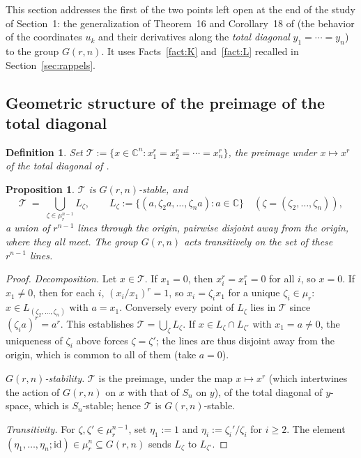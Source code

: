 \documentclass[10pt,a4paper]{amsart}
\newtheorem{proposition}[theorem]{Proposition}
\newtheorem{definition}[theorem]{Definition}
\newcommand{\CC}{\mathbb{C}}
\begin{document}
This section addresses the first of the two points left open at the end of the study of Section~1: the generalization of Theorem~16 and Corollary~18 of \cite{Ze} (the behavior of the coordinates $u_k$ and their derivatives along the \emph{total diagonal} $y_1=\cdots=y_n$) to the group $G(r,n)$. It uses Facts~\ref{fact:K} and~\ref{fact:L} recalled in Section~\ref{sec:rappels}.

\subsection{Geometric structure of the preimage of the total diagonal}

\begin{definition}
Set $\mathcal T := \{x\in\CC^n : x_1^r=x_2^r=\cdots=x_n^r\}$, the preimage under $x\mapsto x^r$ of the total diagonal of \cite{Ze}.
\end{definition}

\begin{proposition}\label{prop:structT}
$\mathcal T$ is $G(r,n)$-stable, and
\[
\mathcal T \;=\; \bigcup_{\zeta\in\mu_r^{n-1}} L_\zeta, \qquad L_\zeta := \{(a,\zeta_2a,\dots,\zeta_na) : a\in\CC\} \quad (\zeta=(\zeta_2,\dots,\zeta_n)),
\]
a union of $r^{n-1}$ lines through the origin, pairwise disjoint away from the origin, where they all meet. The group $G(r,n)$ acts transitively on the set of these $r^{n-1}$ lines.
\end{proposition}

\begin{proof}
\emph{Decomposition.} Let $x\in\mathcal T$. If $x_1=0$, then $x_i^r=x_1^r=0$ for all $i$, so $x=0$. If $x_1\ne0$, then for each $i$, $(x_i/x_1)^r=1$, so $x_i=\zeta_ix_1$ for a unique $\zeta_i\in\mu_r$: $x\in L_{(\zeta_2,\dots,\zeta_n)}$ with $a=x_1$. Conversely every point of $L_\zeta$ lies in $\mathcal T$ since $(\zeta_ia)^r=a^r$. This establishes $\mathcal T=\bigcup_\zeta L_\zeta$. If $x\in L_\zeta\cap L_{\zeta'}$ with $x_1=a\ne0$, the uniqueness of $\zeta_i$ above forces $\zeta=\zeta'$; the lines are thus disjoint away from the origin, which is common to all of them (take $a=0$).

\emph{$G(r,n)$-stability.} $\mathcal T$ is the preimage, under the map $x\mapsto x^r$ (which intertwines the action of $G(r,n)$ on $x$ with that of $S_n$ on $y$), of the total diagonal of $y$-space, which is $S_n$-stable; hence $\mathcal T$ is $G(r,n)$-stable.

\emph{Transitivity.} For $\zeta,\zeta'\in\mu_r^{n-1}$, set $\eta_1:=1$ and $\eta_i:=\zeta_i'/\zeta_i$ for $i\ge2$. The element $(\eta_1,\dots,\eta_n;\mathrm{id})\in\mu_r^n\subseteq G(r,n)$ sends $L_\zeta$ to $L_{\zeta'}$.
\end{proof}
\end{document}
